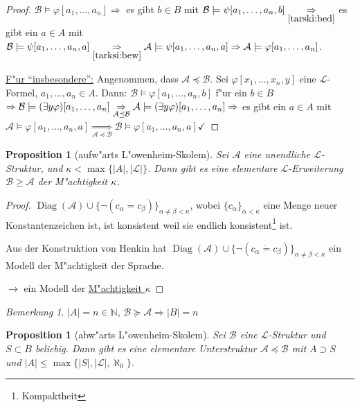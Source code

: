 \documentclass[a4paper,12pt,numbers=noenddot,parskip=full]{scrartcl}
\newcommand{\setN}{\mathbb{N}}
\newcommand{\scrL}{\mathcal{L}}
\newcommand{\scrA}{\mathcal{A}}
\newcommand{\scrB}{\mathcal{B}}
\DeclareMathOperator{\Diag}{Diag}
\newcommand{\vdig}{\Diag}
\theoremstyle{dotless}
\newtheorem{proposition}[theorem]{Proposition}
\theoremstyle{remark}
\newtheorem*{remark}{Bemerkung}
\begin{document}
\begin{proof}
	$\scrB \models \varphi[a_1, \dots, a_n] \Rightarrow$ es gibt $b \in B$ mit $\scrB \models \psi[a_1, \dots, a_n, b] \underset{\ref{tarski:bed}}{\Rightarrow}$ es gibt ein $a \in A$ mit $\scrB \models \psi[a_1, \dots, a_n, a] \underset{\ref{tarksi:bew}}{\Rightarrow} \scrA \models \psi[a_1, \dots, a_n, a] \Rightarrow \scrA \models \varphi[a_1, \dots, a_n]$.
	
	\underline{F"ur "`insbesondere"':} Angenommen, dass $\scrA \preceq \scrB$. Sei $\varphi[x_1, \dots, x_n, y]$ eine $\scrL$-Formel, $a_1, \dots, a_n \in A$. Dann: $\scrB \models \varphi[a_1, \dots, a_n, b]$ f"ur ein $b \in B$ $\Rightarrow \scrB \models (\exists y \varphi)[a_1, \dots, a_n] \\
	\underset{\scrA \preceq \scrB}{\Rightarrow} \scrA \models (\exists y \varphi)[a_1, \dots, a_n] \Rightarrow$ es gibt ein $a \in A$ mit $\scrA \models \varphi[a_1, \dots, a_n, a] {\underset{\scrA \preceq \scrB}{\Rightarrow} \scrB \models \varphi[a_1, \dots, a_n, a]} \checkmark$
\end{proof}

\begin{proposition}[aufw"arts L"owenheim-Skolem]
	Sei $\scrA$ eine unendliche $\scrL$-Struktur, und $\kappa < \max\{|A|,|\scrL|\}$. Dann gibt es eine elementare $\scrL$-Erweiterung $\scrB \geq \scrA$ der M"achtigkeit $\kappa$.
\end{proposition}
\begin{proof}
	$\vdig(\scrA) \cup \{\lnot(c_\alpha \dot= c_\beta)\}_{\alpha \neq \beta < \kappa}$, wobei $\{c_\alpha\}_{\alpha<\kappa}$ eine Menge neuer Konstantenzeichen ist, ist konsistent weil sie endlich konsistent\footnote{Kompaktheit} ist.
	
	Aus der Konstruktion von Henkin hat $\vdig(\scrA) \cup \{\lnot(c_\alpha \dot= c_\beta)\}_{\alpha \neq \beta < \kappa}$ ein Modell der M"achtigkeit der Sprache.
	
	$\rightarrow$ ein Modell der \underline{M"achtigkeit $\kappa$}
\end{proof}

\begin{remark}
	$|A| = n \in \setN$, $\scrB \succeq \scrA \Rightarrow |B| = n$
\end{remark}

\begin{proposition}[abw"arts L"owenheim-Skolem]\label{Low:ab}
	Sei $\scrB$ eine $\scrL$-Struktur und $S \subset B$ beliebig. Dann gibt es eine elementare Unterstruktur $\scrA \preceq \scrB$ mit $A \supset S$ und $|A|\leq \max\{|S|,|\scrL|,\aleph_0\}$.
\end{proposition}
\end{document}
